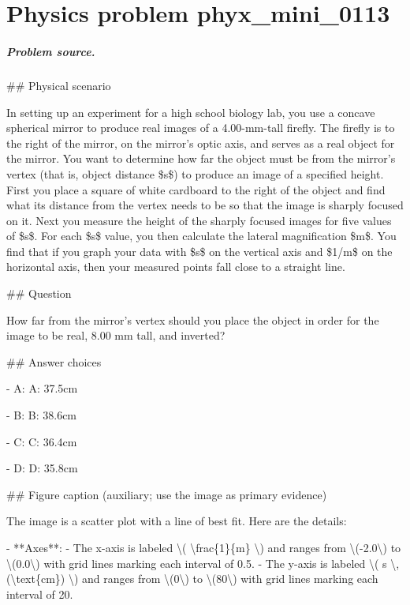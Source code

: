 
\chapter{Physics problem phyx\_mini\_0113}
\label{ch:PhyXMiniProblems_problem_phyx_mini_0113}

\paragraph{Problem source.}
\#\# Physical scenario

In setting up an experiment for a high school biology lab, you use a concave spherical mirror to produce real images of a 4.00-mm-tall firefly. The firefly is to the right of the mirror, on the mirror's optic axis, and serves as a real object for the mirror. You want to determine how far the object must be from the mirror's vertex (that is, object distance \$s\$) to produce an image of a specified height. First you place a square of white cardboard to the right of the object and find what its distance from the vertex needs to be so that the image is sharply focused on it. Next you measure the height of the sharply focused images for five values of \$s\$. For each \$s\$ value, you then calculate the lateral magnification \$m\$. You find that if you graph your data with \$s\$ on the vertical axis and \$1/m\$ on the horizontal axis, then your measured points fall close to a straight line.

\#\# Question

How far from the mirror's vertex should you place the object in order for the image to be real, 8.00 mm tall, and inverted?

\#\# Answer choices

- A: A: 37.5cm

- B: B: 38.6cm

- C: C: 36.4cm

- D: D: 35.8cm

\#\# Figure caption (auxiliary; use the image as primary evidence)

The image is a scatter plot with a line of best fit. Here are the details:

- **Axes**:
  - The x-axis is labeled \textbackslash{}( \textbackslash{}frac\{1\}\{m\} \textbackslash{}) and ranges from \textbackslash{}(-2.0\textbackslash{}) to \textbackslash{}(0.0\textbackslash{}) with grid lines marking each interval of 0.5.
  - The y-axis is labeled \textbackslash{}( s \textbackslash{}, (\textbackslash{}text\{cm\}) \textbackslash{}) and ranges from \textbackslash{}(0\textbackslash{}) to \textbackslash{}(80\textbackslash{}) with grid lines marking each interval of 20.

